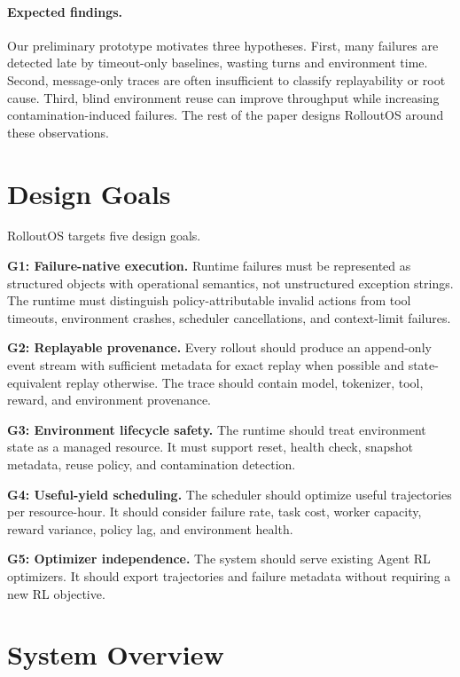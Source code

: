\documentclass{article}
\newcommand{\sys}{RolloutOS}
\begin{document}
\paragraph{Expected findings.}
Our preliminary prototype motivates three hypotheses.
First, many failures are detected late by timeout-only baselines, wasting turns and environment time.
Second, message-only traces are often insufficient to classify replayability or root cause.
Third, blind environment reuse can improve throughput while increasing contamination-induced failures.
The rest of the paper designs \sys{} around these observations.

\section{Design Goals}

\sys{} targets five design goals.

\textbf{G1: Failure-native execution.}
Runtime failures must be represented as structured objects with operational semantics, not unstructured exception strings.
The runtime must distinguish policy-attributable invalid actions from tool timeouts, environment crashes, scheduler cancellations, and context-limit failures.

\textbf{G2: Replayable provenance.}
Every rollout should produce an append-only event stream with sufficient metadata for exact replay when possible and state-equivalent replay otherwise.
The trace should contain model, tokenizer, tool, reward, and environment provenance.

\textbf{G3: Environment lifecycle safety.}
The runtime should treat environment state as a managed resource.
It must support reset, health check, snapshot metadata, reuse policy, and contamination detection.

\textbf{G4: Useful-yield scheduling.}
The scheduler should optimize useful trajectories per resource-hour.
It should consider failure rate, task cost, worker capacity, reward variance, policy lag, and environment health.

\textbf{G5: Optimizer independence.}
The system should serve existing Agent RL optimizers.
It should export trajectories and failure metadata without requiring a new RL objective.

\section{System Overview}
\label{sec:overview}
\end{document}
